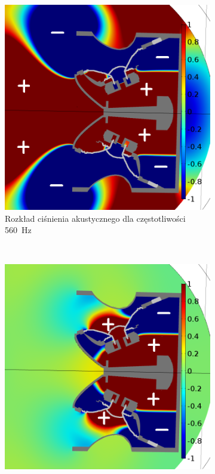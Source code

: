 \documentclass[12pt]{oska}
\begin{document}
\begin{figure}[!ht]
		\begin{subfigure}[b]{.49\textwidth}
			\includegraphics[width=\textwidth]{pres_sig_560Hz_02.png}
			\caption{Rozkład ciśnienia akustycznego dla częstotliwości \SI{560}{\hertz}}
			\label{r:C_560}
		\end{subfigure}
		~
		\begin{subfigure}[b]{.49\textwidth}
			\includegraphics[width=\textwidth]{pres_sig_710Hz_02.png}

\end{subfigure}
\end{figure}
\end{document}
